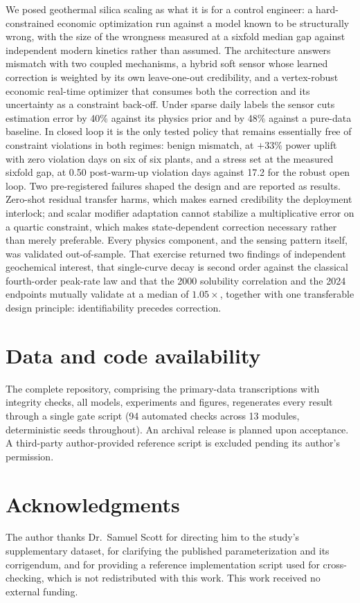 \documentclass[review,number,sort&compress]{elsarticle}
\begin{document}
We posed geothermal silica scaling as what it is for a control
engineer: a hard-constrained economic optimization run against a model
known to be structurally wrong, with the size of the wrongness measured
at a sixfold median gap against independent modern kinetics rather than
assumed. The architecture answers mismatch with two coupled mechanisms,
a hybrid soft sensor whose learned correction is weighted by its own
leave-one-out credibility, and a vertex-robust economic real-time
optimizer that consumes both the correction and its uncertainty as a
constraint back-off. Under sparse daily labels the sensor cuts
estimation error by 40\% against its physics prior and by 48\% against
a pure-data baseline. In closed loop it is the only tested policy that
remains essentially free of constraint violations in both regimes:
benign mismatch, at $+33\%$ power uplift with zero violation days on
six of six plants, and a stress set at the measured sixfold gap, at
0.50 post-warm-up violation days against 17.2 for the robust open
loop. Two pre-registered failures shaped the design and are reported
as results. Zero-shot residual transfer harms, which makes earned
credibility the deployment interlock; and scalar modifier adaptation
cannot stabilize a multiplicative error on a quartic constraint, which
makes state-dependent correction necessary rather than merely
preferable. Every physics component, and the sensing pattern itself,
was validated out-of-sample. That exercise returned two findings of
independent geochemical interest, that single-curve decay is second
order against the classical fourth-order peak-rate law and that the
2000 solubility correlation and the 2024 endpoints mutually validate
at a median of $1.05\times$, together with one transferable design
principle: identifiability precedes correction.

\section*{Data and code availability}
The complete repository, comprising the primary-data transcriptions
with integrity checks, all models, experiments and figures, regenerates
every result through a single gate script (94 automated checks across
13 modules, deterministic seeds throughout). An archival release is
planned upon acceptance. A third-party author-provided reference script
is excluded pending its author's permission.


\section*{Acknowledgments}
The author thanks Dr.~Samuel Scott for directing him to the study's
supplementary dataset, for clarifying the published parameterization
and its corrigendum, and for providing a reference implementation
script used for cross-checking, which is not redistributed with this
work. This work received no external funding.
\end{document}
